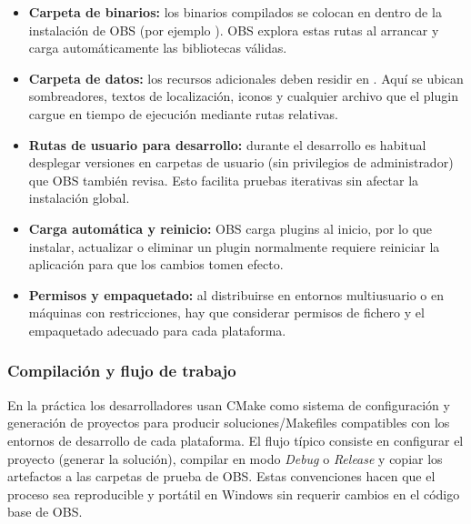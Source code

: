 \begin{itemize}
  \item \textbf{Carpeta de binarios:} los binarios compilados se colocan en  dentro de la instalación de OBS (por ejemplo ). OBS explora estas rutas al arrancar y carga automáticamente las bibliotecas válidas.
  \item \textbf{Carpeta de datos:} los recursos adicionales deben residir en . Aquí se ubican sombreadores, textos de localización, iconos y cualquier archivo que el plugin cargue en tiempo de ejecución mediante rutas relativas.


  \item \textbf{Rutas de usuario para desarrollo:} durante el desarrollo es habitual desplegar versiones en carpetas de usuario (sin privilegios de administrador) que OBS también revisa. Esto facilita pruebas iterativas sin afectar la instalación global.
  \item \textbf{Carga automática y reinicio:} OBS carga plugins al inicio, por lo que instalar, actualizar o eliminar un plugin normalmente requiere reiniciar la aplicación para que los cambios tomen efecto.
  \item \textbf{Permisos y empaquetado:} al distribuirse en entornos multiusuario o en máquinas con restricciones, hay que considerar permisos de fichero y el empaquetado adecuado para cada plataforma.

\end{itemize}

\subsubsection*{Compilación y flujo de trabajo}
En la práctica los desarrolladores usan CMake como sistema de configuración y generación de proyectos para producir soluciones/Makefiles compatibles con los entornos de desarrollo de cada plataforma. El flujo típico consiste en configurar el proyecto (generar la solución), compilar en modo \emph{Debug} o \emph{Release} y copiar los artefactos a las carpetas de prueba de OBS. Estas convenciones hacen que el proceso sea reproducible y portátil en Windows sin requerir cambios en el código base de OBS.


